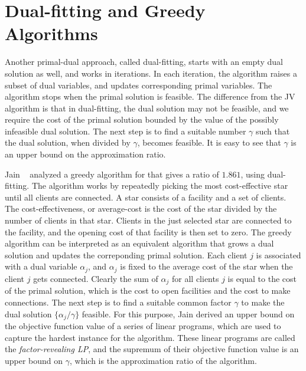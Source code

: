 \documentclass[oneside,final]{ucr}
\begin{document}
\section{Dual-fitting and Greedy Algorithms}
\label{sec: greedy}
Another primal-dual approach, called dual-fitting, starts
with an empty dual solution as well, and works in
iterations. In each iteration, the algorithm raises a subset
of dual variables, and updates corresponding primal
variables. The algorithm stops when the primal solution is
feasible. The difference from the JV algorithm is that in
dual-fitting, the dual solution may not be feasible, and we
require the cost of the primal solution bounded by the value
of the possibly infeasible dual solution. The next step is
to find a suitable number $\gamma$ such that the dual
solution, when divided by $\gamma$, becomes feasible. It is
easy to see that $\gamma$ is an upper bound on the
approximation ratio.

Jain {\etal}~\cite{JainMMSV03} analyzed a greedy algorithm
for {\UFL} that gives a ratio of $1.861$, using
dual-fitting. The algorithm works by repeatedly picking the
most cost-effective star until all clients are connected. A
star consists of a facility and a set of clients. The
cost-effectiveness, or average-cost is the cost of the star
divided by the number of clients in that star. Clients in
the just selected star are connected to the facility, and
the opening cost of that facility is then set to zero. The
greedy algorithm can be interpreted as an equivalent
algorithm that grows a dual solution and updates the
correponding primal solution. Each client $j$ is associated
with a dual variable $\alpha_j$, and $\alpha_j$ is fixed to
the average cost of the star when the client $j$ gets
connected. Clearly the sum of $\alpha_j$ for all clients $j$
is equal to the cost of the primal solution, which is the
cost to open facilities and the cost to make
connections. The next step is to find a suitable common
factor $\gamma$ to make the dual solution $\{\alpha_j /
\gamma\}$ feasible. For this purpose, Jain {\etal} derived
an upper bound on the objective function value of a series
of linear programs, which are used to capture the hardest
instance for the algorithm. These linear programs are called
the \emph{factor-revealing LP}, and the supremum of their
objective function value is an upper bound on $\gamma$,
which is the approximation ratio of the algorithm.
\end{document}
